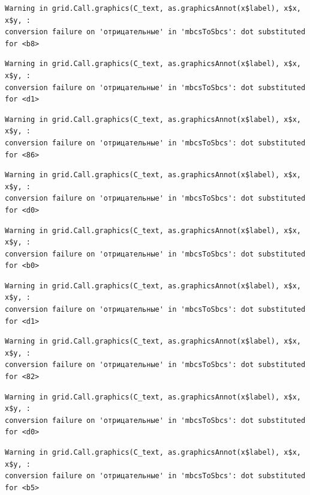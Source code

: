 \documentclass[
  letterpaper,
]{scrbook}
\theoremstyle{definition}
\theoremstyle{remark}
\begin{document}
\begin{verbatim}
Warning in grid.Call.graphics(C_text, as.graphicsAnnot(x$label), x$x, x$y, :
conversion failure on 'отрицательные' in 'mbcsToSbcs': dot substituted for <b8>
\end{verbatim}

\begin{verbatim}
Warning in grid.Call.graphics(C_text, as.graphicsAnnot(x$label), x$x, x$y, :
conversion failure on 'отрицательные' in 'mbcsToSbcs': dot substituted for <d1>
\end{verbatim}

\begin{verbatim}
Warning in grid.Call.graphics(C_text, as.graphicsAnnot(x$label), x$x, x$y, :
conversion failure on 'отрицательные' in 'mbcsToSbcs': dot substituted for <86>
\end{verbatim}

\begin{verbatim}
Warning in grid.Call.graphics(C_text, as.graphicsAnnot(x$label), x$x, x$y, :
conversion failure on 'отрицательные' in 'mbcsToSbcs': dot substituted for <d0>
\end{verbatim}

\begin{verbatim}
Warning in grid.Call.graphics(C_text, as.graphicsAnnot(x$label), x$x, x$y, :
conversion failure on 'отрицательные' in 'mbcsToSbcs': dot substituted for <b0>
\end{verbatim}

\begin{verbatim}
Warning in grid.Call.graphics(C_text, as.graphicsAnnot(x$label), x$x, x$y, :
conversion failure on 'отрицательные' in 'mbcsToSbcs': dot substituted for <d1>
\end{verbatim}

\begin{verbatim}
Warning in grid.Call.graphics(C_text, as.graphicsAnnot(x$label), x$x, x$y, :
conversion failure on 'отрицательные' in 'mbcsToSbcs': dot substituted for <82>
\end{verbatim}

\begin{verbatim}
Warning in grid.Call.graphics(C_text, as.graphicsAnnot(x$label), x$x, x$y, :
conversion failure on 'отрицательные' in 'mbcsToSbcs': dot substituted for <d0>
\end{verbatim}

\begin{verbatim}
Warning in grid.Call.graphics(C_text, as.graphicsAnnot(x$label), x$x, x$y, :
conversion failure on 'отрицательные' in 'mbcsToSbcs': dot substituted for <b5>
\end{verbatim}
\end{document}
